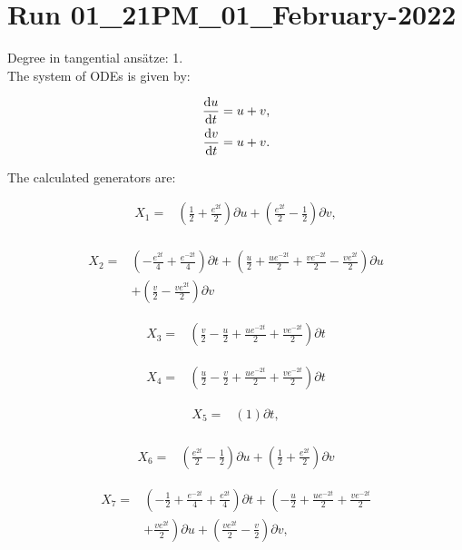 \section*{Run 01\_21PM\_01\_February-2022}
Degree in tangential ansätze:	1.\\
The system of ODEs is given by:

\begin{align*}
\dv{u}{t}&=u + v,\\
\dv{v}{t}&=u + v.\\
\end{align*}

\noindent The calculated generators are:

\begin{align*}
X_{1}=&\left(\frac{1}{2}+\frac{e^{2 t}}{2} \right)\partial u+\left(\frac{e^{2 t}}{2} - \frac{1}{2} \right)\partial v,\\
\end{align*}

\begin{align*}
X_{2}=&\left(- \frac{e^{2 t}}{4}+\frac{e^{- 2 t}}{4} \right)\partial t+\left(\frac{u}{2}+\frac{u e^{- 2 t}}{2}+\frac{v e^{- 2 t}}{2}- \frac{v e^{2 t}}{2} \right)\partial u\\
&+\left(\frac{v}{2}- \frac{v e^{2 t}}{2} \right)\partial v
\end{align*}

\begin{align*}
X_{3}=&\left(\frac{v}{2}- \frac{u}{2}+\frac{u e^{- 2 t}}{2}+\frac{v e^{- 2 t}}{2} \right)\partial t
\end{align*}

\begin{align*}
X_{4}=&\left(\frac{u}{2}- \frac{v}{2}+\frac{u e^{- 2 t}}{2}+\frac{v e^{- 2 t}}{2} \right)\partial t
\end{align*}

\begin{align*}
X_{5}=&\left(1 \right)\partial t,\\
\end{align*}

\begin{align*}
X_{6}=&\left(\frac{e^{2 t}}{2} - \frac{1}{2} \right)\partial u+\left(\frac{1}{2}+\frac{e^{2 t}}{2} \right)\partial v
\end{align*}

\begin{align*}
X_{7}=&\left(- \frac{1}{2}+\frac{e^{- 2 t}}{4}+\frac{e^{2 t}}{4} \right)\partial t+\left(- \frac{u}{2}+\frac{u e^{- 2 t}}{2}+\frac{v e^{- 2 t}}{2}\right.\\
&+\left.\frac{v e^{2 t}}{2} \right)\partial u+\left(\frac{v e^{2 t}}{2} - \frac{v}{2} \right)\partial v,\\
\end{align*}

